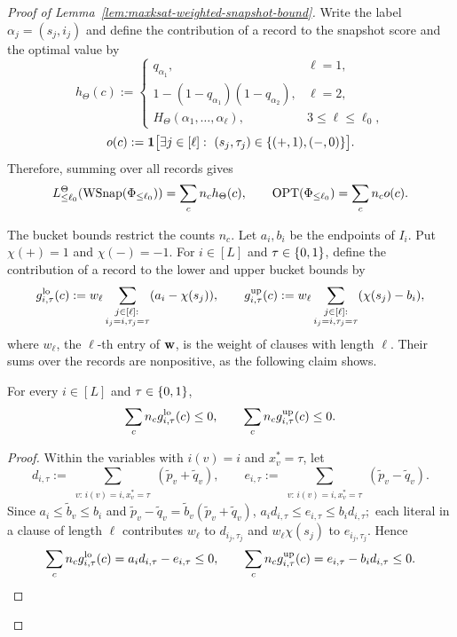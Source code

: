 \begin{proof}[Proof of Lemma~\ref{lem:maxksat-weighted-snapshot-bound}]
Write the label $\alpha_j=(s_j,i_j)$ and define the contribution of a record to the snapshot score and the optimal value by
\[
  h_\Theta(c):=\begin{cases}
    q_{\alpha_1},&\ell=1,\\
    1-(1-q_{\alpha_1})(1-q_{\alpha_2}),&\ell=2,\\
    H_\Theta(\alpha_1,\ldots,\alpha_\ell),&3\le\ell\le\ell_0,
  \end{cases}
\]
\[
  o(c):=\1\bigl[\exists j\in[\ell]:\ (s_j,\tau_j)\in\{(+,1),(-,0)\}\bigr].
\]
Therefore, 
summing over all records gives
\begin{equation}
  L_{\le\ell_0}^\Theta(\operatorname{WSnap}(\Phi_{\le\ell_0}))=\sum_c n_ch_\Theta(c),
  \qquad \operatorname{OPT}(\Phi_{\le\ell_0})=\sum_c n_co(c).
  \label{eq:snapshot-record-sums}
\end{equation}

The bucket bounds restrict the counts $n_c$.
Let $a_i,b_i$ be the endpoints of $I_i$.
Put $\chi(+)=1$ and $\chi(-)=-1$. For $i\in[L]$ and $\tau\in\{0,1\}$, define the contribution of a record to the lower and upper bucket bounds by
\[
  g^{\rm lo}_{i,\tau}(c):=
  w_\ell\sum_{\substack{j\in[\ell]:\,\\
  i_j=i,  \tau_j=\tau}}(a_i-\chi(s_j)),
  \qquad
  g^{\rm up}_{i,\tau}(c):=
  w_\ell\sum_{\substack{j\in[\ell]:\\ i_j=i,  \tau_j=\tau } }(\chi(s_j)-b_i),
\]
where $w_\ell$, the $\ell$-th entry of $\mathbf{w}$, is the weight of clauses with length $\ell$.
Their sums over the records are nonpositive, as the following claim shows.
\begin{claim}\label{clm:snapshot-bucket-sums}
For every $i\in[L]$ and $\tau\in\{0,1\}$,
\[
  \sum_c n_cg^{\rm lo}_{i,\tau}(c)\le0,
  \qquad \sum_c n_cg^{\rm up}_{i,\tau}(c)\le0.
\]
\end{claim}
\begin{proof}
Within the variables with $i(v)=i$ and $x_v^*=\tau$, let
\[
  d_{i,\tau}:=\sum_{\substack{v:\,i(v)=i, x_v^*=\tau}}(\widetilde p_v+\widetilde q_v),
  \qquad
  e_{i,\tau}:=\sum_{\substack{v:\,i(v)=i, x_v^*=\tau}}(\widetilde p_v-\widetilde q_v).
\]
Since $a_i\le\widetilde b_v\le b_i$ and $\widetilde p_v-\widetilde q_v=\widetilde b_v(\widetilde p_v+\widetilde q_v)$,
$
  a_id_{i,\tau}\le e_{i,\tau}\le b_id_{i,\tau};
$
each literal in a clause of length $\ell$ contributes $w_\ell$ to $d_{i_j,\tau_j}$ and $w_\ell\chi(s_j)$ to $e_{i_j,\tau_j}$. Hence
\[
  \sum_c n_cg^{\rm lo}_{i,\tau}(c)=a_id_{i,\tau}-e_{i,\tau}\le0,
  \qquad
  \sum_c n_cg^{\rm up}_{i,\tau}(c)=e_{i,\tau}-b_id_{i,\tau}\le0. \qedhere
\]
\end{proof}





\end{proof}
